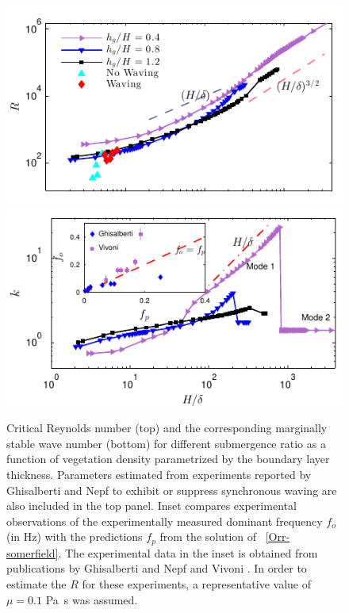 \documentclass[aps,preprint,12pt]{revtex4-1}  %
\newcommand{\Rey}{{R}}
\begin{document}
\begin{figure}
\begin{center}
\includegraphics[]{Critical_Re_vs_delta_noshear} \\
\vspace{-6mm} \hspace{-3mm}
\includegraphics[]{K_vs_shear_width_noshear}
\end{center}
\caption{Critical Reynolds number (top) and the corresponding marginally stable wave number (bottom) for different submergence ratio as a function of vegetation density parametrized by the boundary layer thickness. 
Parameters estimated from experiments reported by Ghisalberti and Nepf \cite{Ghisal02} to exhibit or suppress synchronous waving are also included in the top panel. 
Inset compares experimental observations of the experimentally measured dominant frequency $f_o$ (in Hz) with the predictions $f_p$ from the solution of ~\eqref{Orr-somerfield}. 
The experimental data in the inset is obtained from publications by Ghisalberti and Nepf \cite{Ghisal02} and Vivoni \cite{Vivoni98}. 
In order to estimate the $\Rey$ for these experiments, a representative value of $\mu=0.1$ Pa~s was assumed.}
\label{Re_vs_delta}
\end{figure}
\end{document}
